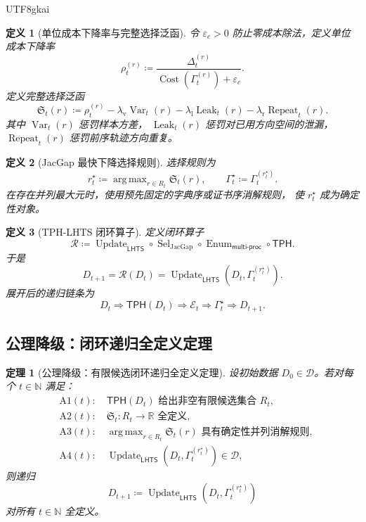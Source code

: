 \documentclass[12pt]{article}
\newtheorem{definition}{定义}[section]
\newtheorem{theorem}{定理}[section]
\newcommand{\NN}{\mathbb{N}}
\newcommand{\RR}{\mathbb{R}}
\newcommand{\LHTS}{\ensuremath{\mathsf{LHTS}}}
\newcommand{\TPH}{\ensuremath{\mathsf{TPH}}}
\newcommand{\DefEq}{\coloneqq}
\DeclareMathOperator{\Cost}{Cost}
\DeclareMathOperator{\JacGap}{JacGap}
\DeclareMathOperator{\Sel}{Sel}
\DeclareMathOperator{\Update}{Update}
\DeclareMathOperator{\Var}{Var}
\DeclareMathOperator{\Leak}{Leak}
\DeclareMathOperator{\Repeat}{Repeat}
\DeclareMathOperator{\Enum}{Enum}
\DeclareMathOperator*{\argmax}{arg\,max}
\begin{document}
\begin{CJK*}{UTF8}{gkai}
\begin{definition}[单位成本下降率与完整选择泛函]
令 \(\varepsilon_c>0\) 防止零成本除法，定义单位成本下降率
\[
\rho_t^{(r)}
\DefEq
\frac{\Delta_t^{(r)}}{\Cost(\Gamma_t^{(r)})+\varepsilon_c}.
\]
定义完整选择泛函
\[
\boxed{
\mathfrak S_t(r)
\DefEq
\rho_t^{(r)}
-\lambda_{\mathrm v}\Var_t(r)
-\lambda_{\mathrm l}\Leak_t(r)
-\lambda_{\mathrm r}\Repeat_t(r).
}
\]
其中 \(\Var_t(r)\) 惩罚样本方差，
\(\Leak_t(r)\) 惩罚对已用方向空间的泄漏，
\(\Repeat_t(r)\) 惩罚前序轨迹方向重复。
\end{definition}

\begin{definition}[JacGap 最快下降选择规则]
选择规则为
\[
\boxed{
r_t^\star
\DefEq
\argmax_{r\in R_t}\mathfrak S_t(r),
\qquad
\Gamma_t^\star
\DefEq
\Gamma_t^{(r_t^\star)}.
}
\]
在存在并列最大元时，使用预先固定的字典序或证书序消解规则，
使 \(r_t^\star\) 成为确定性对象。
\end{definition}

\begin{definition}[TPH-LHTS 闭环算子]
定义闭环算子
\[
\boxed{
\mathcal R
\DefEq
\Update_{\LHTS}
\circ
\Sel_{\JacGap}
\circ
\Enum_{\mathsf{multi\mbox{-}proc}}
\circ
\TPH.
}
\]
于是
\[
\boxed{
D_{t+1}=\mathcal R(D_t)
=
\Update_{\LHTS}\!\left(D_t,\Gamma_t^{(r_t^\star)}\right).
}
\]
展开后的递归链条为
\[
\boxed{
D_t
\Longrightarrow
\TPH(D_t)
\Longrightarrow
\mathcal E_t
\Longrightarrow
\Gamma_t^\star
\Longrightarrow
D_{t+1}.
}
\]
\end{definition}

\subsection{公理降级：闭环递归全定义定理}
\label{subsec:axiom-downgrade-recursion}

\begin{theorem}[公理降级：有限候选闭环递归全定义定理]
设初始数据 \(D_0\in\mathcal D\)。若对每个 \(t\in\NN\) 满足：
\[
\begin{aligned}
&\mathrm{A1}(t):\quad
\TPH(D_t)\text{ 给出非空有限候选集合 }R_t,\\
&\mathrm{A2}(t):\quad
\mathfrak S_t:R_t\to\RR\text{ 全定义},\\
&\mathrm{A3}(t):\quad
\argmax_{r\in R_t}\mathfrak S_t(r)\text{ 具有确定性并列消解规则},\\
&\mathrm{A4}(t):\quad
\Update_{\LHTS}(D_t,\Gamma_t^{(r_t^\star)})\in\mathcal D,
\end{aligned}
\]
则递归
\[
D_{t+1}
\DefEq
\Update_{\LHTS}(D_t,\Gamma_t^{(r_t^\star)})
\]
对所有 \(t\in\NN\) 全定义。
\end{theorem}


\end{CJK*}
\end{document}
